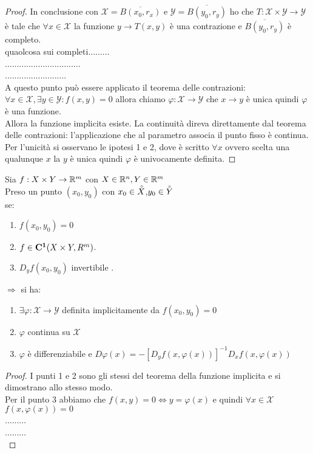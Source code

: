 \begin{theorem}
\begin{proof}
		In conclusione con $\mathcal{X}=\overline{B(x_0,r_x)}$ e $\mathcal{Y}=\overline{B(y_0,r_y)}$ ho che $T:\mathcal{X}\times\mathcal{Y}\rightarrow\mathcal{Y}$ è tale che $\forall x\in\mathcal{X}$ la funzione $y\rightarrow T(x,y)$ è una contrazione e $\overline{B(y_0,r_y)}$ è completo.\\
		quaolcosa sui completi.........\\
		................................\\
		..........................\\
		A questo punto può essere applicato il teorema delle contrazioni:\\
		$\forall x \in \mathcal{X}, \exists y \in\mathcal{Y}: f(x,y)=0$ allora chiamo $\varphi:\mathcal{X}\rightarrow\mathcal{Y}$ che $x\rightarrow y$ è unica quindi $\varphi$ è una funzione.\\
		Allora la funzione implicita esiste. La continuità direva direttamente dal teorema delle contrazioni: l'applicazione che al parametro associa il punto fisso è continua.\\
		Per l'unicità si osservano le ipotesi 1 e 2, dove è scritto $\forall x$ ovvero scelta una qualunque $x$ la $y$ è unica quindi $\varphi$ è univocamente definita.
		
	\end{proof}
\end{theorem}
\proposition
Sia $f:X\times Y\rightarrow \mathbb{R}^m$ con $X\in \mathbb{R}^n, Y\in \mathbb{R}^m$\\
Preso un punto $(x_0,y_0)$ con $x_0\in \accentset{\circ}{X}$,$y_0\in \accentset{\circ}{Y}$\\
se:
\begin{enumerate}
	\item $f(x_0,y_0)=0$
	\item $f\in \mathbf{C^{1}}(X\times Y,R^m)$.
	\item $D_yf(x_0,y_0)$ invertibile .
\end{enumerate}
$\Rightarrow $ si ha:\\
\begin{enumerate}
	\item $\exists \varphi: \mathcal{X}\rightarrow\mathcal{Y}$ definita implicitamente da $f(x_0,y_0)=0$
	\item $\varphi$ continua su $\mathcal{X}$
	\item $\varphi$ è differenziabile e $D\varphi(x)=-[D_yf(x,\varphi(x))]^{-1}D_xf(x,\varphi(x))$
\end{enumerate}
\begin{proof}
	I punti 1 e 2 sono gli stessi del teorema della funzione implicita e si dimostrano allo stesso modo.\\
	Per il punto 3 abbiamo che $f(x,y)=0\iff y=\varphi(x)$ e quindi $\forall x\in \mathcal{X}$ $f(x,\varphi(x))=0$\\
	.........\\
	.........\\
	
\end{proof}

